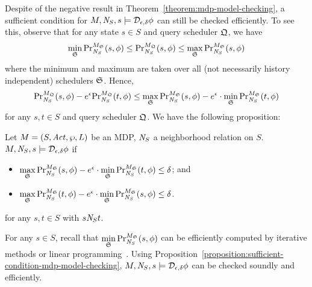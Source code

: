 Despite of the negative result in Theorem~\ref{theorem:mdp-model-checking},
a sufficient condition for $M, \neighbor{S}, s \models
\dpriv{\epsilon}{\delta} \phi$ can still be checked
efficiently. To see this, observe that for any state $s \in S$ and
query scheduler $\scheduler{Q}$, we have
\[
  \min_{\scheduler{S}} \myPr{s}{M_{\scheduler{S}}}{\neighbor{S}}{\phi} 
  \leq
  \myPr{s}{M_{\scheduler{Q}}}{\neighbor{S}}{\phi} 
  \leq
  \max_{\scheduler{S}} \myPr{s}{M_{\scheduler{S}}}{\neighbor{S}}{\phi} 
\]
where the minimum and maximum are taken over all (not necessarily
history independent) schedulers $\scheduler{S}$. Hence,
\begin{eqnarray*}
  \myPr{s}{M_{\scheduler{Q}}}{\neighbor{S}}{\phi} -
      e^\epsilon \myPr{t}{M_{\scheduler{Q}}}{\neighbor{S}}{\phi}
  \leq
    \max_{\scheduler{S}} \myPr{s}{M_{\scheduler{S}}}{\neighbor{S}}{\phi}
    - e^\epsilon \cdot
    \min_{\scheduler{S}} \myPr{t}{M_{\scheduler{S}}}{\neighbor{S}}{\phi}
\end{eqnarray*}
for any $s, t \in S$ and query scheduler $\scheduler{Q}$. We have the
following proposition:
\begin{proposition}\label{proposition:sufficient-condition-mdp-model-checking}
  Let $M = (S, \Act, \wp, L)$ be an MDP, $\neighbor{S}$ a
  neighborhood relation on $S$.
  $M, \neighbor{S}, s \models \dpriv{\epsilon}{\delta} \phi$ if
  \begin{itemize}
  \item $\max\limits_{\scheduler{S}} \myPr{s}{M_{\scheduler{S}}}{\neighbor{S}}{\phi}
    - e^\epsilon \cdot
    \min\limits_{\scheduler{S}} \myPr{t}{M_{\scheduler{S}}}{\neighbor{S}}{\phi}
    \leq \delta$; and
  \item $\max\limits_{\scheduler{S}} \myPr{t}{M_{\scheduler{S}}}{\neighbor{S}}{\phi}
    - e^\epsilon \cdot
    \min\limits_{\scheduler{S}} \myPr{s}{M_{\scheduler{S}}}{\neighbor{S}}{\phi}
    \leq \delta$.
  \end{itemize}
  for any $s, t \in S$ with $s \neighbor{S} t$.
\end{proposition}

For any $s \in S$, recall that $\min\limits_{\scheduler{S}}
\myPr{s}{M_{\scheduler{S}}}{\neighbor{S}}{\phi}$ can be efficiently
computed by iterative methods or linear programming~\cite{BK:08:PMC}. 
Using
Proposition~\ref{proposition:sufficient-condition-mdp-model-checking},
$M, \neighbor{S}, s \models \dpriv{\epsilon}{\delta} \phi$ can be
checked soundly and efficiently.

